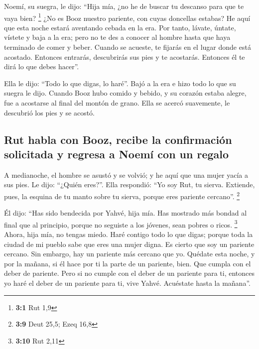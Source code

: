\begin{paracol}{2}
 Noemí, su suegra, le dijo: ``Hija mía, ¿no he de buscar
tu descanso para que te vaya bien? \footnote{\textbf{3:1} Rut 1,9}
 ¿No es Booz nuestro pariente, con cuyas doncellas
estabas? He aquí que esta noche estará aventando cebada en la era.
 Por tanto, lávate, úntate, vístete y baja a la era; pero
no te des a conocer al hombre hasta que haya terminado de comer y beber.
 Cuando se acueste, te fijarás en el lugar donde está
acostado. Entonces entrarás, descubrirás sus pies y te acostarás.
Entonces él te dirá lo que debes hacer''.

 Ella le dijo: ``Todo lo que digas, lo haré''.
 Bajó a la era e hizo todo lo que su suegra le dijo.
 Cuando Booz hubo comido y bebido, y su corazón estaba
alegre, fue a acostarse al final del montón de grano. Ella se acercó
suavemente, le descubrió los pies y se acostó.

\hypertarget{rut-habla-con-booz-recibe-la-confirmaciuxf3n-solicitada-y-regresa-a-noemuxed-con-un-regalo}{%
\subsection{Rut habla con Booz, recibe la confirmación solicitada y
regresa a Noemí con un
regalo}\label{rut-habla-con-booz-recibe-la-confirmaciuxf3n-solicitada-y-regresa-a-noemuxed-con-un-regalo}}

 A medianoche, el hombre se asustó y se volvió; y he aquí
que una mujer yacía a sus pies.  Le dijo: ``¿Quién
eres?''. Ella respondió: ``Yo soy Rut, tu sierva. Extiende, pues, la
esquina de tu manto sobre tu sierva, porque eres pariente cercano''.
\footnote{\textbf{3:9} Deut 25,5; Ezeq 16,8}

 Él dijo: ``Has sido bendecida por Yahvé, hija mía. Has
mostrado más bondad al final que al principio, porque no seguiste a los
jóvenes, sean pobres o ricos. \footnote{\textbf{3:10} Rut 2,11}
 Ahora, hija mía, no tengas miedo. Haré contigo todo lo
que digas; porque toda la ciudad de mi pueblo sabe que eres una mujer
digna.  Es cierto que soy un pariente cercano. Sin
embargo, hay un pariente más cercano que yo.  Quédate
esta noche, y por la mañana, si él hace por ti la parte de un pariente,
bien. Que cumpla con el deber de pariente. Pero si no cumple con el
deber de un pariente para ti, entonces yo haré el deber de un pariente
para ti, vive Yahvé. Acuéstate hasta la mañana''.


\end{paracol}

